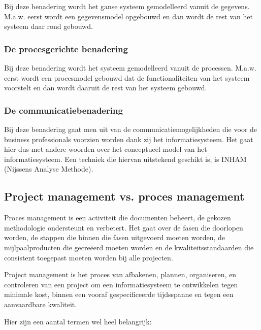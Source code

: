 Bij deze benadering wordt het ganse systeem gemodelleerd vanuit de gegevens. M.a.w. eerst wordt een gegevensmodel opgebouwd en dan wordt de rest van het systeem daar rond gebouwd.

\subsubsection{De procesgerichte benadering}

Bij deze benadering wordt het systeem gemodelleerd vanuit de processen. M.a.w. eerst wordt een procesmodel gebouwd dat de functionaliteiten van het systeem voorstelt en dan wordt daaruit de rest van het systeem gebouwd.

\subsubsection{De communicatiebenadering}

Bij deze benadering gaat men uit van de communicatiemogelijkheden die voor de business professionals voorzien worden dank zij het informatiesysteem. Het gaat hier dus met andere woorden over het conceptueel model van het informatiesysteem. Een techniek die hiervan uitstekend geschikt is, is INHAM (Nijssens Analyse Methode).

\subsection{Project management vs. proces management}

Proces management is een activiteit die documenten beheert, de gekozen methodologie ondersteunt en verbetert. Het gaat over de fasen die doorlopen worden, de stappen die binnen die fasen uitgevoerd moeten worden, de mijlpaalproducten die gecreëerd moeten worden en de kwaliteitsstandaarden die consistent toegepast moeten worden bij alle projecten.

Project management is het proces van afbakenen, plannen, organiseren, en controleren van een project om een informatiesysteem te ontwikkelen tegen minimale kost, binnen een vooraf gespecificeerde tijdsspanne en tegen een aanvaardbare kwaliteit.

Hier zijn een aantal termen wel heel belangrijk:

